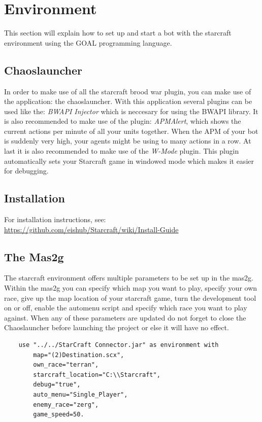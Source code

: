 \chapter{Environment}
This section will explain how to set up and start a bot with the starcraft environment using the GOAL programming language.

\section{Chaoslauncher}
In order to make use of all the starcraft brood war plugin, you can make use of the application: the chaoslauncher. With this application several plugins can be used like the: \textit{BWAPI Injector} which is neccesary for using the BWAPI library. It is also recommended to make use of the plugin: \textit{APMAlert}, which shows the current actions per minute of all your units together. When the APM of your bot is suddenly very high, your agents might be using to many actions in a row. At last it is also recommended to make use of the \textit{W-Mode} plugin. This plugin automatically sets your Starcraft game in windowed mode which makes it easier for debugging. 

\section{Installation}
For installation instructions, see: \url{https://github.com/eishub/Starcraft/wiki/Install-Guide}

\section{The Mas2g}
\label{mas2g}
The starcraft environment offers multiple parameters to be set up in the mas2g. Within the mas2g you can specify which map you want to play, specify your own race, give up the map location of your starcraft game, turn the development tool on or off, enable the automenu script and specify which race you want to play against. When any of these parameters are updated do not forget to close the Chaoslauncher before launching the project or else it will have no effect.

\begin{verbatim}
    use "../../StarCraft Connector.jar" as environment with
        map="(2)Destination.scx",
        own_race="terran",
        starcraft_location="C:\\Starcraft",
        debug="true",
        auto_menu="Single_Player",
        enemy_race="zerg",
        game_speed=50.
\end{verbatim}

